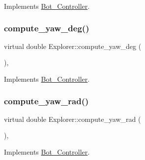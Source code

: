 Implements \hyperlink{class_bot___controller_a836b1e434c1c15ccec0b81313a32aca8}{Bot\+\_\+\+Controller}.

\mbox{\label{class_explorer_a9235375b60669fc046c41318759dc1dc}} 
\subsubsection{\texorpdfstring{compute\+\_\+yaw\+\_\+deg()}{compute\_yaw\_deg()}}
{\footnotesize\ttfamily virtual double Explorer\+::compute\+\_\+yaw\+\_\+deg (\begin{DoxyParamCaption}{ }\end{DoxyParamCaption})\hspace{0.3cm}{\ttfamily [override]}, {\ttfamily [virtual]}}



Implements \hyperlink{class_bot___controller_abda61292c3719a4a5676ddcd0d8311a1}{Bot\+\_\+\+Controller}.

\mbox{\label{class_explorer_abace49485da40310e567a77689bcb377}} 
\subsubsection{\texorpdfstring{compute\+\_\+yaw\+\_\+rad()}{compute\_yaw\_rad()}}
{\footnotesize\ttfamily virtual double Explorer\+::compute\+\_\+yaw\+\_\+rad (\begin{DoxyParamCaption}{ }\end{DoxyParamCaption})\hspace{0.3cm}{\ttfamily [override]}, {\ttfamily [virtual]}}



Implements \hyperlink{class_bot___controller_a362541183536f955e54234e14f18f3c2}{Bot\+\_\+\+Controller}.

\mbox{\label{class_explorer_a00f687c86ecf3de47a1b424a3b2e07ea}} 
